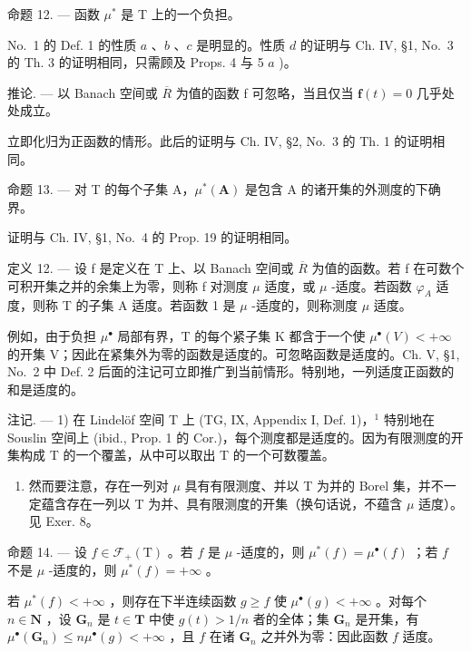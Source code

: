 命题 12. --- 函数 \(\mu^{*}\) 是 T 上的一个负担。

No.~1 的 Def. 1 的性质 \(a\) 、\(b\) 、\(c\) 是明显的。性质 \(d\) 的证明与 Ch. IV, §1, No.~3 的 Th. 3 的证明相同，只需顾及 Props. 4 与 5 \(a\) )。

推论. --- 以 Banach 空间或 \(\overline{R}\) 为值的函数 f 可忽略，当且仅当 \(\mathbf{f}(t)=0\) 几乎处处成立。

立即化归为正函数的情形。此后的证明与 Ch. IV, §2, No.~3 的 Th. 1 的证明相同。

命题 13. --- 对 T 的每个子集 A，\(\mu^{*}(\mathbf{A})\) 是包含 A 的诸开集的外测度的下确界。

证明与 Ch. IV, §1, No.~4 的 Prop. 19 的证明相同。

定义 12. --- 设 f 是定义在 T 上、以 Banach 空间或 \(\overline{R}\) 为值的函数。若 f 在可数个可积开集之并的余集上为零，则称 f 对测度 \(\mu\) 适度，或 \(\mu\) -适度。若函数 \(\varphi_{A}\) 适度，则称 T 的子集 A 适度。若函数 1 是 \(\mu\) -适度的，则称测度 \(\mu\) 适度。

例如，由于负担 \(\mu^{\bullet}\) 局部有界，T 的每个紧子集 K 都含于一个使 \(\mu^{\bullet}(V)<+\infty\) 的开集 V；因此在紧集外为零的函数是适度的。可忽略函数是适度的。Ch. V, §1, No.~2 中 Def. 2 后面的注记可立即推广到当前情形。特别地，一列适度正函数的和是适度的。

注记. --- 1) 在 Lindelöf 空间 T 上 (TG, IX, Appendix I, Def. 1)，\(^{1}\) 特别地在 Souslin 空间上 (ibid., Prop. 1 的 Cor.)，每个测度都是适度的。因为有限测度的开集构成 T 的一个覆盖，从中可以取出 T 的一个可数覆盖。

\begin{enumerate}
\def\labelenumi{\arabic{enumi})}
\setcounter{enumi}{1}
\tightlist
\item
  然而要注意，存在一列对 \(\mu\) 具有有限测度、并以 T 为并的 Borel 集，并不一定蕴含存在一列以 T 为并、具有限测度的开集（换句话说，不蕴含 \(\mu\) 适度）。见 Exer. 8。
\end{enumerate}

命题 14. --- 设 \(f \in \mathcal{F}_{+}(\mathrm{T})\) 。若 \(f\) 是 \(\mu\) -适度的，则 \(\mu^{*}(f) = \mu^{\bullet}(f)\) ；若 \(f\) 不是 \(\mu\) -适度的，则 \(\mu^{*}(f) = +\infty\) 。

若 \(\mu^{*}(f) < +\infty\) ，则存在下半连续函数 \(g \geqslant f\) 使 \(\mu^{\bullet}(g) < +\infty\) 。对每个 \(n \in \mathbf{N}\) ，设 \(\mathbf{G}_{n}\) 是 \(t \in \mathbf{T}\) 中使 \(g(t) > 1/n\) 者的全体；集 \(\mathbf{G}_{n}\) 是开集，有 \(\mu^{\bullet}(\mathbf{G}_{n}) \leqslant n\mu^{\bullet}(g) < +\infty\) ，且 \(f\) 在诸 \(\mathbf{G}_{n}\) 之并外为零：因此函数 \(f\) 适度。

